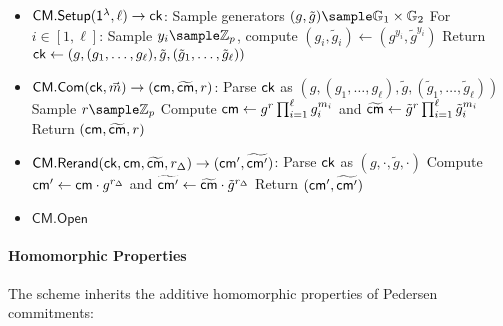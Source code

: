 \begin{itemize}
    \item $\mathsf{CM.Setup}(\mathsf{1^{\lambda}}, \ell) \to \mathsf{ck}$:
    Sample generators $(g, \tilde{g}) \sample \G_1 \times \G_2$
    For $i \in [1,\ell]$: Sample $y_i \sample \Z_p$, compute $(g_i, \tilde{g}_i) \gets (g^{y_i}, \tilde{g}^{y_i})$
    Return $\mathsf{ck} \gets (g, (g_1,\ldots,g_\ell), \tilde{g}, (\tilde{g}_1,\ldots,\tilde{g}_\ell))$
    
    \item $\mathsf{CM.Com}(\mathsf{ck}, \vec{m}) \to (\mathsf{cm}, \widetilde{\mathsf{cm}}, r)$:
    Parse $\mathsf{ck}$ as $(g, (g_1,\ldots,g_\ell), \tilde{g}, (\tilde{g}_1,\ldots,\tilde{g}_\ell))$
    Sample $r \sample \Z_p$
    Compute $\mathsf{cm} \gets g^r \prod_{i=1}^\ell g_i^{m_i}$ and $\widetilde{\mathsf{cm}} \gets \tilde{g}^r \prod_{i=1}^\ell \tilde{g}_i^{m_i}$
    Return $(\mathsf{cm}, \widetilde{\mathsf{cm}}, r)$
    
    \item $\mathsf{CM.Rerand}(\mathsf{ck}, \mathsf{cm}, \widetilde{\mathsf{cm}}, r_\Delta) \to (\mathsf{cm}', \widetilde{\mathsf{cm}'})$:
    Parse $\mathsf{ck}$ as $(g, \cdot, \tilde{g}, \cdot)$
    Compute $\mathsf{cm}' \gets \mathsf{cm} \cdot g^{r_\Delta}$ and $\widetilde{\mathsf{cm}'} \gets \widetilde{\mathsf{cm}} \cdot \tilde{g}^{r_\Delta}$
    Return $(\mathsf{cm}', \widetilde{\mathsf{cm}'})$

    \item $\mathsf{CM.Open}$
\end{itemize}

\paragraph{Homomorphic Properties}
The scheme inherits the additive homomorphic properties of Pedersen commitments:

